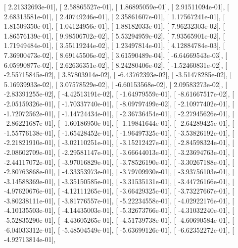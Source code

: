 \documentclass{article}
\begin{document}
       [  2.21332693e-01],
       [  2.58865527e-01],
       [  1.86895059e-01],
       [  2.91511094e-01],
       [  2.68313581e-01],
       [  2.40749246e-01],
       [  2.35861607e-01],
       [  1.17567241e-01],
       [  1.81509350e-01],
       [  1.04124956e-01],
       [  1.88182033e-01],
       [  7.96232303e-02],
       [  1.86576139e-01],
       [  9.98506702e-02],
       [  5.53294959e-02],
       [  7.93565901e-02],
       [  1.71949484e-01],
       [  3.55119244e-02],
       [  1.23497814e-01],
       [  4.12884784e-03],
       [  7.36900473e-02],
       [  8.69145506e-02],
       [  3.61590489e-04],
       [ -6.64669543e-03],
       [  6.05990877e-02],
       [  2.62636351e-02],
       [  8.24280406e-02],
       [ -1.52460831e-02],
       [ -2.55715845e-02],
       [  3.87803914e-02],
       [ -6.43762393e-02],
       [ -3.51478285e-02],
       [  5.16939933e-02],
       [  3.07578529e-02],
       [ -6.60153568e-02],
       [  2.09583273e-02],
       [ -2.83391255e-02],
       [ -4.42513191e-02],
       [ -1.64979559e-01],
       [ -8.61667517e-02],
       [ -2.05159326e-01],
       [ -1.70337740e-01],
       [ -8.09797499e-02],
       [ -2.10977402e-01],
       [ -1.72072562e-01],
       [ -1.14724434e-01],
       [ -2.36736454e-01],
       [ -2.27945626e-01],
       [ -2.86221687e-01],
       [ -1.60186950e-01],
       [ -1.19841644e-01],
       [ -2.64289425e-01],
       [ -1.55776138e-01],
       [ -1.65428452e-01],
       [ -1.96497325e-01],
       [ -3.53826192e-01],
       [ -2.21821910e-01],
       [ -3.02110251e-01],
       [ -3.15212427e-01],
       [ -2.84598324e-01],
       [ -2.08602709e-01],
       [ -2.29581147e-01],
       [ -3.66644013e-01],
       [ -3.23694763e-01],
       [ -2.44117072e-01],
       [ -3.97016829e-01],
       [ -3.78526190e-01],
       [ -3.30267188e-01],
       [ -2.80763868e-01],
       [ -4.33353973e-01],
       [ -3.79709930e-01],
       [ -3.93756103e-01],
       [ -3.14588369e-01],
       [ -3.35150585e-01],
       [ -3.31535131e-01],
       [ -3.44726166e-01],
       [ -4.97620676e-01],
       [ -4.12111265e-01],
       [ -3.66429325e-01],
       [ -3.73227667e-01],
       [ -3.80238111e-01],
       [ -3.81776557e-01],
       [ -5.22234558e-01],
       [ -4.02922176e-01],
       [ -4.10135503e-01],
       [ -4.14435003e-01],
       [ -5.32673766e-01],
       [ -4.31032240e-01],
       [ -5.52835290e-01],
       [ -4.43605265e-01],
       [ -4.51739738e-01],
       [ -4.60690584e-01],
       [ -6.04033312e-01],
       [ -5.48504549e-01],
       [ -5.63699126e-01],
       [ -6.62352272e-01],
       [ -4.92713814e-01],
\end{document}
